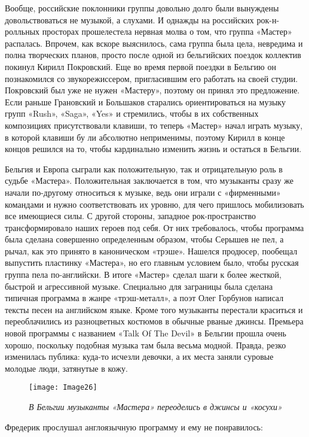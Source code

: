 \documentclass[16pt,a5paper,oneside]{book}
\begin{document}
Вообще, российские поклонники группы довольно долго были вынуждены довольствоваться не музыкой, а слухами. И однажды на
российских рок-н-ролльных просторах прошелестела нервная молва о том, что группа «Мастер» распалась. Впрочем, как вскоре
выяснилось, сама группа была цела, невредима и полна творческих планов, просто после одной из бельгийских поездок
коллектив покинул Кирилл Покровский. Еще во время первой поездки в Бельгию он познакомился со звукорежиссером,
пригласившим его работать на своей студии. Покровский был уже не нужен «Мастеру», поэтому он принял это предложение.
Если раньше Грановский и Большаков старались ориентироваться на музыку групп «Rush», «Saga», «Yes» и стремились, чтобы в
их собственных композициях присутствовали клавиши, то теперь «Мастер» начал играть музыку, в которой клавиши бу ли
абсолютно неприменимы, поэтому Кирилл в конце концов решился на то, чтобы кардинально изменить жизнь и остаться в
Бельгии.

Бельгия и Европа сыграли как положительную, так и отрицательную роль в судьбе «Мастера». Положительная заключается в
том, что музыканты сразу же начали по-другому относиться к музыке, ведь они играли с «фирменными» командами и нужно
соответствовать их уровню, для чего пришлось мобилизовать все имеющиеся силы. С другой стороны, западное
рок-пространство трансформировало наших героев под себя. От них требовалось, чтобы программа была сделана совершенно
определенным образом, чтобы Серышев не пел, а рычал, как это принято в каноническом «трэше». Нашелся продюсер, пообещал
выпустить пластинку «Мастера», но его главным условием было, чтобы русская группа пела по-английски. В итоге «Мастер»
сделал шаги к более жесткой, быстрой и агрессивной музыке. Специально для заграницы была сделана типичная программа в
жанре «трэш-металл», а поэт Олег Горбунов написал тексты песен на английском языке. Кроме того музыканты перестали
краситься и переоблачились из разноцветных костюмов в обычные рваные джинсы. Премьера новой программы с названием «Talk
Of The Devil» в Бельгии прошла очень хорошо, поскольку подобная музыка там была весьма модной. Правда, резко изменилась
публика: куда-то исчезли девочки, а их места заняли суровые молодые люди, затянутые в кожу.

\begin{figure}
    \centering
    \texttt{[image: Image26]}
    \caption{\textit{В Бельгии музыканты «Мастера» переоделись в джинсы и «косухи»}}
\end{figure}

Фредерик прослушал англоязычную программу и ему не понравилось:
\end{document}
